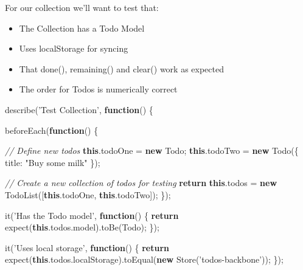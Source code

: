 \documentclass[9pt]{book}
\newenvironment{Shaded}{}{}
\newcommand{\KeywordTok}[1]{\textcolor[rgb]{0.00,0.44,0.13}{\textbf{{#1}}}}
\newcommand{\DataTypeTok}[1]{\textcolor[rgb]{0.56,0.13,0.00}{{#1}}}
\newcommand{\StringTok}[1]{\textcolor[rgb]{0.25,0.44,0.63}{{#1}}}
\newcommand{\CommentTok}[1]{\textcolor[rgb]{0.38,0.63,0.69}{\textit{{#1}}}}
\newcommand{\OtherTok}[1]{\textcolor[rgb]{0.00,0.44,0.13}{{#1}}}
\newcommand{\FunctionTok}[1]{\textcolor[rgb]{0.02,0.16,0.49}{{#1}}}
\newcommand{\NormalTok}[1]{{#1}}
\begin{document}
For our collection we'll want to test that:

\begin{itemize}
\itemsep1pt\parskip0pt
\item
  The Collection has a Todo Model
\item
  Uses localStorage for syncing
\item
  That done(), remaining() and clear() work as expected
\item
  The order for Todos is numerically correct
\end{itemize}

\begin{Shaded}
\begin{Highlighting}[]
  \FunctionTok{describe}\NormalTok{(}\StringTok{'Test Collection'}\NormalTok{, }\KeywordTok{function}\NormalTok{() \{}

    \FunctionTok{beforeEach}\NormalTok{(}\KeywordTok{function}\NormalTok{() \{}

      \CommentTok{// Define new todos}
      \KeywordTok{this}\NormalTok{.}\FunctionTok{todoOne} \NormalTok{= }\KeywordTok{new} \NormalTok{Todo;}
      \KeywordTok{this}\NormalTok{.}\FunctionTok{todoTwo} \NormalTok{= }\KeywordTok{new} \FunctionTok{Todo}\NormalTok{(\{}
        \DataTypeTok{title}\NormalTok{: }\StringTok{"Buy some milk"}
      \NormalTok{\});}

      \CommentTok{// Create a new collection of todos for testing}
      \KeywordTok{return} \KeywordTok{this}\NormalTok{.}\FunctionTok{todos} \NormalTok{= }\KeywordTok{new} \FunctionTok{TodoList}\NormalTok{([}\KeywordTok{this}\NormalTok{.}\FunctionTok{todoOne}\NormalTok{, }\KeywordTok{this}\NormalTok{.}\FunctionTok{todoTwo}\NormalTok{]);}
    \NormalTok{\});}

    \FunctionTok{it}\NormalTok{(}\StringTok{'Has the Todo model'}\NormalTok{, }\KeywordTok{function}\NormalTok{() \{}
      \KeywordTok{return} \FunctionTok{expect}\NormalTok{(}\KeywordTok{this}\NormalTok{.}\OtherTok{todos}\NormalTok{.}\FunctionTok{model}\NormalTok{).}\FunctionTok{toBe}\NormalTok{(Todo);}
    \NormalTok{\});}

    \FunctionTok{it}\NormalTok{(}\StringTok{'Uses local storage'}\NormalTok{, }\KeywordTok{function}\NormalTok{() \{}
      \KeywordTok{return} \FunctionTok{expect}\NormalTok{(}\KeywordTok{this}\NormalTok{.}\OtherTok{todos}\NormalTok{.}\FunctionTok{localStorage}\NormalTok{).}\FunctionTok{toEqual}\NormalTok{(}\KeywordTok{new} \FunctionTok{Store}\NormalTok{(}\StringTok{'todos-backbone'}\NormalTok{));}
    \NormalTok{\});}


\end{Highlighting}
\end{Shaded}
\end{document}
